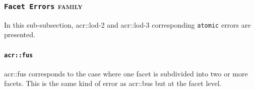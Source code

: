         \subsubsection{\texttt{Facet Errors} \textsc{family}}
            In this sub-subsection, \gls{acr::lod}-2 and \gls{acr::lod}-3 corresponding \texttt{atomic} errors are presented.

            \paragraph{\texttt{\acrlong*{acr::fus}}}
                \gls{acr::fus} corresponds to the case where one facet is subdivided into two or more facets.
                This is the same kind of error as \gls{acr::bus} but at the facet level.\\

